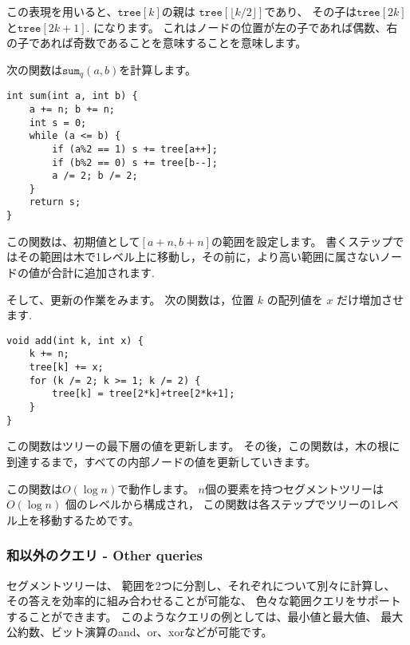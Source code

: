 この表現を用いると、$\texttt{tree}[k]$の親は 
$\texttt{tree}[\lfloor k/2 \rfloor]$であり、
その子は$\texttt{tree}[2k]$
と$\texttt{tree}[2k+1]$.
になります。
これはノードの位置が左の子であれば偶数、右の子であれば奇数であることを意味することを意味します。

次の関数は$\texttt{sum}_q(a,b)$を計算します。
\begin{lstlisting}
int sum(int a, int b) {
    a += n; b += n;
    int s = 0;
    while (a <= b) {
        if (a%2 == 1) s += tree[a++];
        if (b%2 == 0) s += tree[b--];
        a /= 2; b /= 2;
    }
    return s;
}
\end{lstlisting}
この関数は、初期値として$[a+n,b+n]$の範囲を設定します。
書くステップではその範囲は木で1レベル上に移動し，その前に，より高い範囲に属さないノードの値が合計に追加されます.

そして、更新の作業をみます。
次の関数は，位置 $k$ の配列値を $x$ だけ増加させます.
\begin{lstlisting}
void add(int k, int x) {
    k += n;
    tree[k] += x;
    for (k /= 2; k >= 1; k /= 2) {
        tree[k] = tree[2*k]+tree[2*k+1];
    }
}
\end{lstlisting}
この関数はツリーの最下層の値を更新します。
その後，この関数は，木の根に到達するまで，すべての内部ノードの値を更新していきます。

この関数は$O(\log n)$で動作します。
$n$個の要素を持つセグメントツリーは$O(\log n)$ 個のレベルから構成され，
この関数は各ステップでツリーの1レベル上を移動するためです。

\subsubsection{和以外のクエリ - Other queries}

セグメントツリーは、
範囲を2つに分割し、それぞれについて別々に計算し、
その答えを効率的に組み合わせることが可能な、
色々な範囲クエリをサポートすることができます。
このようなクエリの例としては、最小値と最大値、 最大公約数、ビット演算のand、or、xorなどが可能です。

